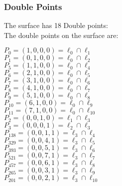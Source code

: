 \documentclass{article}
\begin{document}
{\subsubsection*{Double Points}
The surface has 18 Double points:\\
The double points on the surface are:\\
\begin{multicols}{2}
\noindent
$P_{0} = ( 1, 0, 0, 0 ) = \ell_{0} \cap \ell_{1} $\\
$P_{1} = ( 0, 1, 0, 0 ) = \ell_{0} \cap \ell_{2} $\\
$P_{5} = ( 1, 1, 0, 0 ) = \ell_{0} \cap \ell_{4} $\\
$P_{6} = ( 2, 1, 0, 0 ) = \ell_{0} \cap \ell_{5} $\\
$P_{7} = ( 3, 1, 0, 0 ) = \ell_{0} \cap \ell_{6} $\\
$P_{8} = ( 4, 1, 0, 0 ) = \ell_{0} \cap \ell_{7} $\\
$P_{9} = ( 5, 1, 0, 0 ) = \ell_{0} \cap \ell_{8} $\\
$P_{10} = ( 6, 1, 0, 0 ) = \ell_{0} \cap \ell_{9} $\\
$P_{11} = ( 7, 1, 0, 0 ) = \ell_{0} \cap \ell_{10} $\\
$P_{2} = ( 0, 0, 1, 0 ) = \ell_{1} \cap \ell_{3} $\\
$P_{3} = ( 0, 0, 0, 1 ) = \ell_{2} \cap \ell_{3} $\\
$P_{138} = ( 0, 0, 1, 1 ) = \ell_{3} \cap \ell_{4} $\\
$P_{329} = ( 0, 0, 4, 1 ) = \ell_{3} \cap \ell_{5} $\\
$P_{393} = ( 0, 0, 5, 1 ) = \ell_{3} \cap \ell_{6} $\\
$P_{521} = ( 0, 0, 7, 1 ) = \ell_{3} \cap \ell_{7} $\\
$P_{457} = ( 0, 0, 6, 1 ) = \ell_{3} \cap \ell_{8} $\\
$P_{265} = ( 0, 0, 3, 1 ) = \ell_{3} \cap \ell_{9} $\\
$P_{201} = ( 0, 0, 2, 1 ) = \ell_{3} \cap \ell_{10} $\\
\end{multicols}
}
\end{document}
